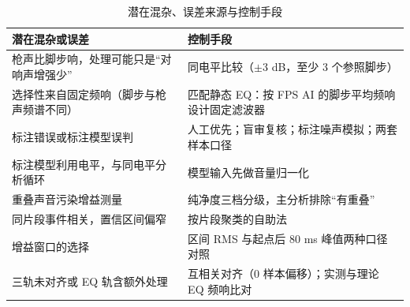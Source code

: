 \begin{table}[htbp]\centering
\caption{潜在混杂、误差来源与控制手段}\label{tab:threat}
{\small\begin{threeparttable}
\begin{tabularx}{\linewidth}{LL}\toprule
潜在混杂或误差 & 控制手段 \\
\midrule
枪声比脚步响，处理可能只是“对响声增强少” & 同电平比较（$\pm$3 dB，至少 3 个参照脚步） \\
选择性来自固定频响（脚步与枪声频谱不同） & 匹配静态 EQ：按 FPS AI 的脚步平均频响设计固定滤波器 \\
标注错误或标注模型误判 & 人工优先；盲审复核；标注噪声模拟；两套样本口径 \\
标注模型利用电平，与同电平分析循环 & 模型输入先做音量归一化 \\
重叠声音污染增益测量 & 纯净度三档分级，主分析排除“有重叠” \\
同片段事件相关，置信区间偏窄 & 按片段聚类的自助法 \\
增益窗口的选择 & 区间 RMS 与起点后 80 ms 峰值两种口径对照 \\
三轨未对齐或 EQ 轨含额外处理 & 互相关对齐（0 样本偏移）；实测与理论 EQ 频响比对 \\
\bottomrule\end{tabularx}
\end{threeparttable}}
\end{table}
